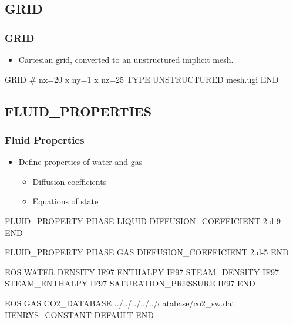 \documentclass{beamer}
\begin{document}
\subsection{GRID}
\begin{frame}\frametitle{GRID}

\begin{itemize}
  \item Cartesian grid, converted to an unstructured implicit mesh.
\end{itemize}

\begin{semiverbatim}
GRID
  # nx=20 x ny=1 x nz=25
  TYPE UNSTRUCTURED mesh.ugi
END
\end{semiverbatim}

\end{frame}
\subsection{FLUID\_PROPERTIES}
\begin{frame}\frametitle{Fluid Properties}

\begin{itemize}
  \item Define properties of water and gas
  \begin{itemize}
    \item Diffusion coefficients
    \item Equations of state
  \end{itemize}
\end{itemize}

\begin{semiverbatim}
FLUID_PROPERTY
  PHASE LIQUID
  DIFFUSION_COEFFICIENT 2.d-9
END

FLUID_PROPERTY
  PHASE GAS
  DIFFUSION_COEFFICIENT 2.d-5
END

\newpage

EOS WATER
  DENSITY IF97
  ENTHALPY IF97
  STEAM_DENSITY IF97
  STEAM_ENTHALPY IF97
  SATURATION_PRESSURE IF97
END

EOS GAS
  CO2_DATABASE ../../../../../database/co2_sw.dat
  HENRYS_CONSTANT DEFAULT
END

\end{semiverbatim}

\end{frame}
\end{document}
